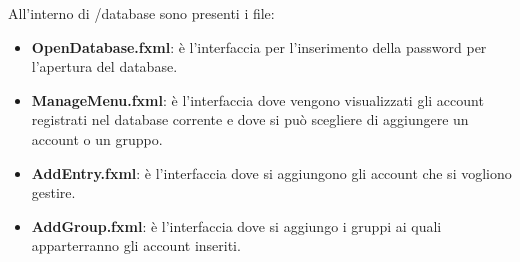 \documentclass[a4paper,12pt]{report}
\begin{document}
All'interno di /database sono presenti i file:

\begin{itemize}
    \item \textbf{OpenDatabase.fxml}: è l'interfaccia per l'inserimento della password per l'apertura del database.
    \item \textbf{ManageMenu.fxml}: è l'interfaccia dove vengono visualizzati gli account registrati nel database corrente e dove si può scegliere di aggiungere un account o un gruppo.
    \item \textbf{AddEntry.fxml}: è l'interfaccia dove si aggiungono gli account che si vogliono gestire.
    \item \textbf{AddGroup.fxml}: è l'interfaccia dove si aggiungo i gruppi ai quali apparterranno gli account inseriti.
\end{itemize}
\end{document}

